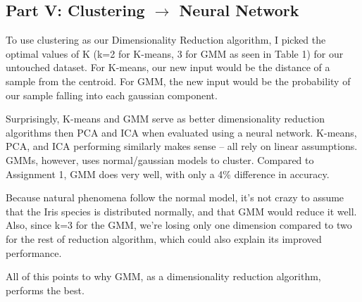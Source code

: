\documentclass[letter]{article}
\begin{document}
\subsection{Part V: Clustering $\rightarrow$ Neural Network}
To use clustering as our Dimensionality Reduction algorithm, I picked the optimal values of K (k=2 for K-means, 3 for GMM as seen in Table 1) for our untouched dataset. For K-means, our new input would be the distance of a sample from the centroid. For GMM, the new input would be the probability of our sample falling into each gaussian component.

Surprisingly, K-means and GMM serve as better dimensionality reduction algorithms then PCA and ICA when evaluated using a neural network. K-means, PCA, and ICA performing similarly makes sense -- all rely on linear assumptions. GMMs, however, uses normal/gaussian models to cluster. Compared to Assignment 1, GMM does very well, with only a 4\% difference in accuracy.

Because natural phenomena follow the normal model, it's not crazy to assume that the Iris species is distributed normally, and that GMM would reduce it well. Also, since k=3 for the GMM, we're losing only one dimension compared to two for the rest of reduction algorithm, which could also explain its improved performance.

All of this points to why GMM, as a dimensionality reduction algorithm, performs the best.
\printbibliography
\end{document}
